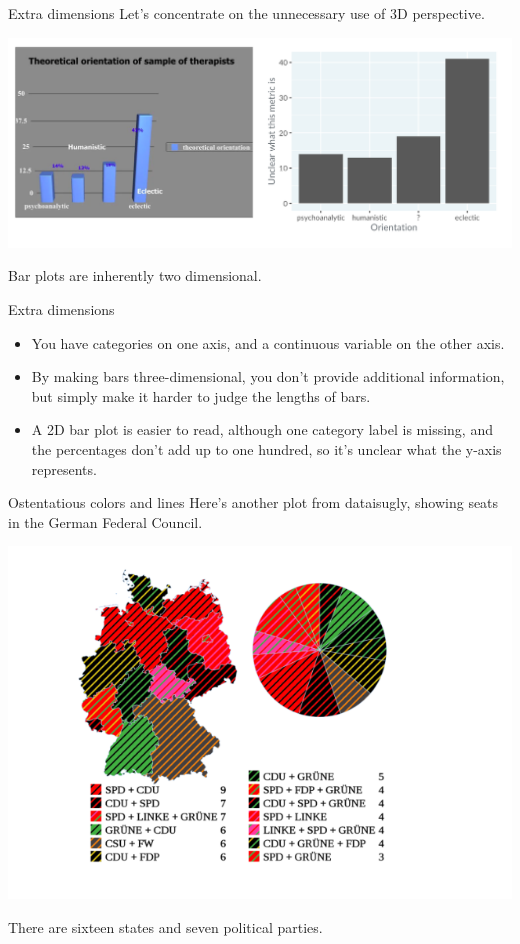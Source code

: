 \documentclass[
  ignorenonframetext,
]{beamer}
\begin{document}
\begin{frame}{Extra dimensions}
\label{extra-dimensions-1}
Let's concentrate on the unnecessary use of 3D perspective.

\includegraphics{../images/im116.png}

Bar plots are inherently two dimensional.
\end{frame}

\begin{frame}{Extra dimensions}
\label{extra-dimensions-2}
\begin{itemize}
\item
  You have categories on one axis, and a continuous variable on the
  other axis.
\item
  By making bars three-dimensional, you don't provide additional
  information, but simply make it harder to judge the lengths of bars.
\item
  A 2D bar plot is easier to read, although one category label is
  missing, and the percentages don't add up to one hundred, so it's
  unclear what the y-axis represents.
\end{itemize}
\end{frame}

\begin{frame}{Ostentatious colors and lines}
\label{ostentatious-colors-and-lines}
Here's another plot from dataisugly, showing seats in the German Federal
Council.

\includegraphics{../images/im117.png}

There are sixteen states and seven political parties.
\end{frame}
\end{document}
